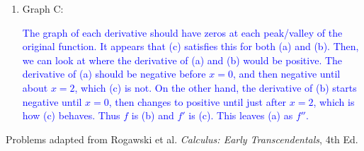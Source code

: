 \documentclass{ximera}
\begin{document}
\begin{exercise}
\begin{enumerate}
\begin{image}
\begin{tikzpicture}
            \end{tikzpicture}
        \end{image}
        \item Graph C:
        \begin{image}
        \end{image}
        
        \textcolor{blue}{The graph of each derivative should have zeros at each peak/valley of the original function.  It appears that (c) satisfies this for both (a) and (b).  Then, we can look at where the derivative of (a) and (b) would be positive.  The derivative of (a) should be negative before $x=0$, and then negative until about $x=2$, which (c) is not.  On the other hand, the derivative of (b) starts negative until $x=0$, then changes to positive until just after $x=2$, which is how (c) behaves.  Thus $f$ is (b) and $f'$ is (c).  This leaves (a) as $f''$. }
    \end{enumerate}

\end{exercise}


Problems adapted from Rogawski et al. \textit{Calculus: Early Transcendentals}, 4th Ed. 
\end{document}
